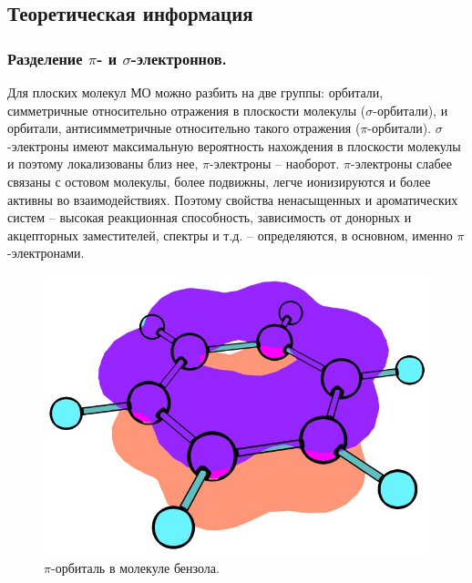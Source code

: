\subsection{Теоретическая информация}
\subsubsection{Разделение $\pi$- и $\sigma$-электроннов.}
Для плоских молекул МО можно разбить на две группы: орбитали, симметричные относительно отражения в плоскости молекулы ($\sigma$-орбитали), и орбитали, антисимметричные относительно такого отражения ($\pi$-орбитали). $\sigma$-электроны имеют максимальную вероятность нахождения в плоскости молекулы и поэтому локализованы близ нее, $\pi$-электроны – наоборот. $\pi$-электроны слабее связаны с остовом молекулы, более подвижны, легче ионизируются и более активны во взаимодействиях. Поэтому свойства ненасыщенных и ароматических систем – высокая реакционная способность, зависимость от донорных и акцепторных заместителей, спектры и т.д. – определяются, в основном, именно $\pi$-электронами.

\begin{figure}[H]
\centering
\captionsetup{justification=centering}
\includegraphics[scale=0.4]{fig/2.jpg}
\caption{$\pi$-орбиталь в молекуле бензола.}
\end{figure}

